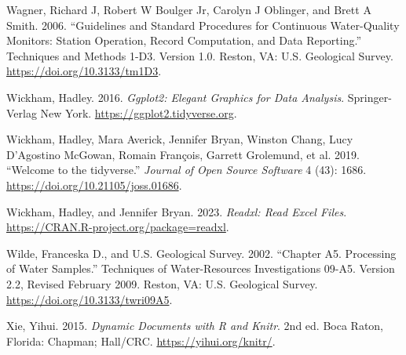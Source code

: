 \begin{CSLReferences}{1}{0}
\leavevmode{}%
Wagner, Richard J, Robert W Boulger Jr, Carolyn J Oblinger, and Brett A Smith. 2006. {``Guidelines and Standard Procedures for Continuous Water-Quality Monitors: Station Operation, Record Computation, and Data Reporting.''} Techniques and Methods 1-D3. Version 1.0. Reston, VA: U.S. Geological Survey. \url{https://doi.org/10.3133/tm1D3}.

\leavevmode{}%
Wickham, Hadley. 2016. \emph{Ggplot2: Elegant Graphics for Data Analysis}. Springer-Verlag New York. \url{https://ggplot2.tidyverse.org}.

\leavevmode{}%
Wickham, Hadley, Mara Averick, Jennifer Bryan, Winston Chang, Lucy D'Agostino McGowan, Romain François, Garrett Grolemund, et al. 2019. {``Welcome to the {tidyverse}.''} \emph{Journal of Open Source Software} 4 (43): 1686. \url{https://doi.org/10.21105/joss.01686}.

\leavevmode{}%
Wickham, Hadley, and Jennifer Bryan. 2023. \emph{Readxl: Read Excel Files}. \url{https://CRAN.R-project.org/package=readxl}.

\leavevmode{}%
Wilde, Franceska D., and U.S. Geological Survey. 2002. {``Chapter A5. Processing of Water Samples.''} Techniques of Water-Resources Investigations 09-A5. Version 2.2, Revised February 2009. Reston, VA: U.S. Geological Survey. \url{https://doi.org/10.3133/twri09A5}.

\leavevmode{}%
Xie, Yihui. 2015. \emph{Dynamic Documents with {R} and Knitr}. 2nd ed. Boca Raton, Florida: Chapman; Hall/CRC. \url{https://yihui.org/knitr/}.

\end{CSLReferences}



\address{%
Marcus W. Beck\\
Tampa Bay Estuary Program\\%
263 13th Ave S\\ St.~Petersburg, Florida, USA 33701\\
%
\url{https://tbep.org}\\%
\textit{ORCiD: \href{https://orcid.org/0000-0002-4996-0059}{0000-0002-4996-0059}}\\%
\href{mailto:mbeck@tbep.org}{\nolinkurl{mbeck@tbep.org}}%
}

\address{%
Benjamen Wetherill\\
ACASAK Consulting\\%
Boston, Massachusetts, USA\\
%
\url{https://www.acasak.com/}\\%
\textit{ORCiD: \href{https://orcid.org/0000-0002-0912-0225}{0000-0002-0912-0225}}\\%
\href{mailto:bwetherill@acasak.co}{\nolinkurl{bwetherill@acasak.co}}%
}

